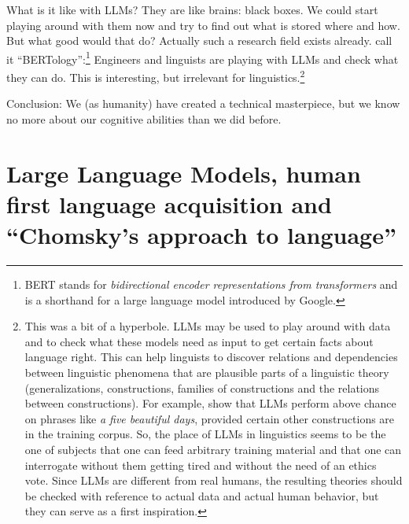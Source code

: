 What is it like with LLMs? They are like brains: black boxes. We could start playing around with
them now and try to find out what is stored where and how. But what good would that do? Actually
such a research field exists already. \citet[]{BK2020a} call it ``BERTology'':\footnote{%
  BERT stands for \emph{bidirectional encoder representations from transformers} and is a shorthand
  for a large language model introduced by Google.%
}
Engineers and linguists are playing with LLMs and check what they can do. This is interesting, but irrelevant for
linguistics.\footnote{%
  This was a bit of a hyperbole. LLMs may be used to play around with data and to check what these
  models need as input to get certain facts about language right. This can help linguists to
  discover relations and dependencies between linguistic phenomena that are plausible parts of a
  linguistic theory (generalizations, constructions, families of constructions and the relations
  between constructions). For example,
  \citet{MisraMahowald2024a} show that LLMs perform above chance on phrases like \emph{a five
    beautiful days}, provided certain other constructions are in the training corpus. So, the place of LLMs in
  linguistics seems to be the one of subjects that one can feed arbitrary training material and that
  one can interrogate without them getting tired and without the need of an ethics vote. Since LLMs
  are different from real humans, the resulting theories should be checked with reference to actual
  data and actual human behavior, but they can serve as a first inspiration.%
} 

Conclusion: We (as humanity) have created a technical masterpiece, but we know no more about our
cognitive abilities than we did before.

\section{Large Language Models, human first language acquisition and ``Chomsky's approach to language''}

